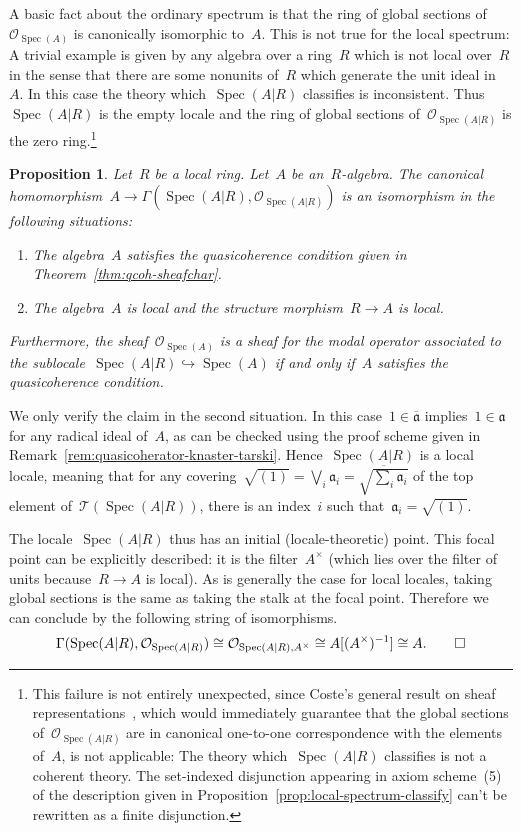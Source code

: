 \documentclass[10pt,reqno,a4paper]{amsbook}
\makeatletter
\theoremstyle{definition}
\theoremstyle{plain}
\newtheorem{prop}[defn]{Proposition}
\theoremstyle{remark}
\renewcommand{\O}{\mathcal{O}}
\newcommand{\T}{\mathcal{T}}
\newcommand{\aaa}{\mathfrak{a}}
\DeclareMathOperator{\Spec}{Spec}
\newcommand{\Open}{\T}
\newcommand{\?}{\,{:}\,}
\renewcommand{\_}{\mathpunct{.}\,}
\renewenvironment{proof}[1][\proofname]{\par
  \pushQED{\qed}%
  \normalfont \topsep6\p@\@plus6\p@\relax
  \trivlist
  \item[\hskip\labelsep
        \itshape
    #1\@addpunct{.}]\ignorespaces
}{%
  \popQED\endtrivlist\@endpefalse
}
\makeatother
\begin{document}
A basic fact about the ordinary spectrum is that the ring of global sections
of~$\O_{\Spec(A)}$ is canonically isomorphic to~$A$. This is not true for the
local spectrum: A trivial example is given by any algebra over a
ring~$R$ which is not local over~$R$ in the sense that there are some nonunits
of~$R$ which generate the unit ideal in~$A$.
In this case the theory which~$\Spec(A|R)$ classifies is
inconsistent. Thus~$\Spec(A|R)$ is the empty locale and the ring of global
sections of~$\O_{\Spec(A|R)}$ is the zero ring.\footnote{This failure is not
entirely unexpected, since Coste's general result on sheaf
representations~\cite[Theorem~5.1.1]{coste:sheaf-representation}, which would
immediately guarantee that the global sections of~$\O_{\Spec(A|R)}$ are in
canonical one-to-one correspondence with the elements of~$A$, is not
applicable: The theory which~$\Spec(A|R)$ classifies is not a coherent
theory. The set-indexed disjunction appearing in axiom scheme~(5) of the
description given in Proposition~\ref{prop:local-spectrum-classify} can't be
rewritten as a finite disjunction.}

\begin{prop}\label{prop:local-spectrum-global-functions}
Let~$R$ be a local ring. Let~$A$ be an~$R$-algebra. The canonical
homomorphism~$A \to \Gamma(\Spec(A|R), \O_{\Spec(A|R)})$ is an isomorphism in
the following situations:
\begin{enumerate}
\item The algebra~$A$ satisfies the quasicoherence condition given in
Theorem~\ref{thm:qcoh-sheafchar}.
\item The algebra~$A$ is local and the structure morphism~$R \to A$ is local.
\end{enumerate}
Furthermore, the sheaf~$\O_{\Spec(A)}$ is a sheaf
for the modal operator associated to the sublocale~$\Spec(A|R) \hookrightarrow
\Spec(A)$ if and only if~$A$ satisfies the quasicoherence condition.
\end{prop}

\begin{proof}We only verify the claim in the second situation. In this
case~$1 \in \overline{\aaa}$ implies~$1 \in \aaa$ for any radical ideal of~$A$,
as can be checked using the proof scheme given in
Remark~\ref{rem:quasicoherator-knaster-tarski}.
Hence~$\Spec(A|R)$ is a local locale, meaning that for any covering~$\sqrt{(1)}
= \bigvee_i \aaa_i = \overline{\sqrt{\sum_i \aaa_i}}$ of the top element
of~$\Open(\Spec(A|R))$, there is an index~$i$ such that~$\aaa_i = \sqrt{(1)}$.

The locale~$\Spec(A|R)$ thus has an initial (locale-theoretic) point. This
focal point can be explicitly described: it is the filter~$A^\times$ (which
lies over the filter of units because~$R \to A$ is local). As is generally the
case for local locales, taking global sections is the same as taking the stalk
at the focal point. Therefore we can conclude by the following string of
isomorphisms.
\[ \Gamma(\Spec(A|R), \O_{\Spec(A|R)}) \cong
  \O_{\Spec(A|R), A^\times} \cong
  A[(A^\times)^{-1}] \cong
  A. \qedhere \]
\end{proof}
\end{document}
